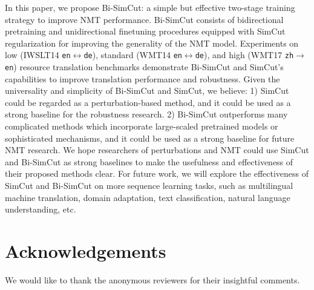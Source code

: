 \documentclass[11pt]{article}
\begin{document}
In this paper, we propose Bi-SimCut: a simple but effective two-stage training strategy to improve NMT performance. Bi-SimCut consists of bidirectional pretraining and unidirectional finetuning procedures equipped with SimCut regularization for improving the generality of the NMT model. Experiments on low (IWSLT14 \texttt{en}$\leftrightarrow$\texttt{de}), standard (WMT14 \texttt{en}$\leftrightarrow$\texttt{de}), and high (WMT17 \texttt{zh}$\rightarrow$\texttt{en}) resource translation benchmarks demonstrate Bi-SimCut and SimCut's capabilities to improve translation performance and robustness. Given the universality and simplicity of Bi-SimCut and SimCut, we believe: 1) SimCut could be regarded as a perturbation-based method, and it could be used as a strong baseline for the robustness research. 2) Bi-SimCut outperforms many complicated methods which incorporate large-scaled pretrained models or sophisticated mechanisms, and it could be used as a strong baseline for future NMT research. We hope researchers of perturbations and NMT could use SimCut and Bi-SimCut as strong baselines to make the usefulness and effectiveness of their proposed methods clear. For future work, we will explore the effectiveness of SimCut and Bi-SimCut on more sequence learning tasks, such as multilingual machine translation, domain adaptation, text classification, natural language understanding, etc.








\section*{Acknowledgements}

We would like to thank the anonymous reviewers for their insightful comments.



\end{document}
